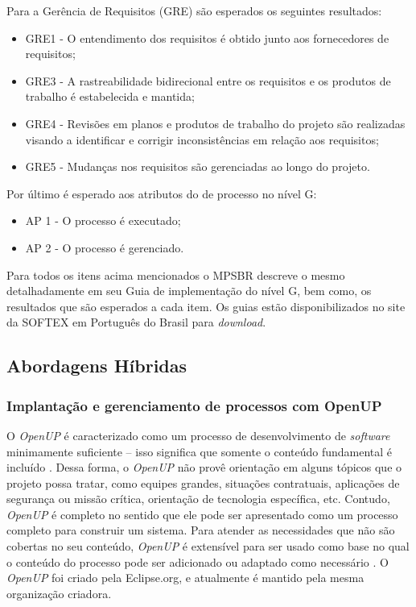 \documentclass{acm_proc_article-sp}
\begin{document}
Para a Gerência de Requisitos (GRE) são esperados os seguintes resultados:
\begin{itemize}
\item GRE1 - O entendimento dos requisitos é obtido junto aos fornecedores de requisitos;
\item GRE3 - A rastreabilidade bidirecional entre os requisitos e os produtos de trabalho é estabelecida e mantida;
\item GRE4 - Revisões em planos e produtos de trabalho do projeto são realizadas visando a identificar e corrigir inconsistências em relação aos requisitos;
\item GRE5 - Mudanças nos requisitos são gerenciadas ao longo do projeto.
\end{itemize}

Por último é esperado aos atributos do de processo no nível G:
\begin{itemize}
\item AP 1 - O processo é executado;
\item AP 2 - O processo é gerenciado.
\end{itemize}

Para todos os itens acima mencionados o MPSBR \cite{mpsbr:nAgil} descreve o mesmo detalhadamente em seu Guia de implementação do nível G, bem como, os resultados que são esperados a cada item. Os guias estão disponibilizados no site da SOFTEX em Português do Brasil para \textit{download}.


\subsection{Abordagens Híbridas}

\subsubsection{Implantação e gerenciamento de processos com OpenUP}
O \textit{OpenUP} é caracterizado como um processo de desenvolvimento de \textit{software} minimamente suficiente – isso
significa que somente o conteúdo fundamental é incluído \cite{openUP:agil}. Dessa forma, o \textit{OpenUP} não provê orientação em
alguns tópicos que o projeto possa tratar, como equipes grandes, situações contratuais, aplicações de segurança ou missão crítica, orientação de tecnologia específica, etc. Contudo, \textit{OpenUP} é completo no sentido que ele pode ser apresentado como um processo completo para construir um sistema. Para atender as necessidades que não são cobertas no seu conteúdo, \textit{OpenUP} é extensível para ser usado como base no qual o conteúdo do processo pode ser adicionado ou adaptado como necessário \cite{openUP:agil}. O \textit{OpenUP} foi criado pela Eclipse.org, e atualmente é mantido pela mesma organização criadora.
\end{document}
